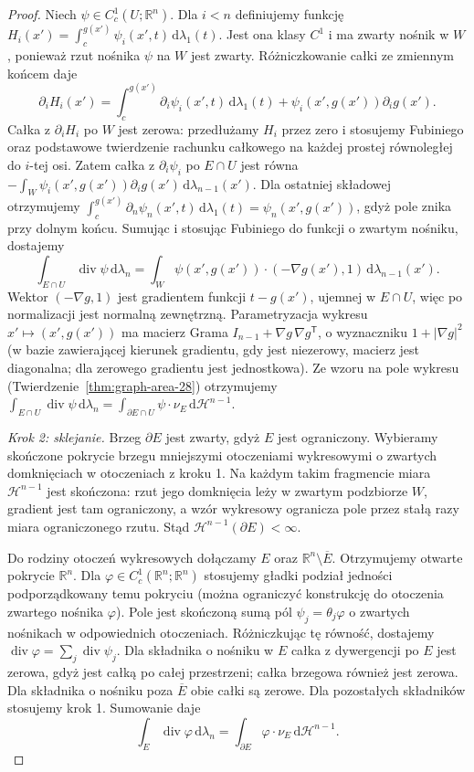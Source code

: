 \begin{proof}
Niech $\psi\in C_c^1(U;\mathbb R^n)$.
Dla $i<n$ definiujemy funkcję
$H_i(x')=\int_c^{g(x')}\psi_i(x',t)\,\mathrm d\lambda_1(t)$.
Jest ona klasy $C^1$ i ma zwarty nośnik w $W$,
ponieważ rzut nośnika $\psi$ na $W$ jest zwarty.
Różniczkowanie całki ze zmiennym końcem daje
\[
 \partial_i H_i(x')=
 \int_c^{g(x')}\partial_i\psi_i(x',t)\,\mathrm d\lambda_1(t)
 +\psi_i(x',g(x'))\partial_i g(x').
\]
Całka z $\partial_i H_i$ po $W$ jest zerowa:
przedłużamy $H_i$ przez zero i stosujemy Fubiniego
oraz podstawowe twierdzenie rachunku całkowego
na każdej prostej równoległej do $i$-tej osi.
Zatem całka z $\partial_i\psi_i$ po $E\cap U$
jest równa
$-\int_W\psi_i(x',g(x'))\partial_i g(x')
\,\mathrm d\lambda_{n-1}(x')$.
Dla ostatniej składowej otrzymujemy
$\int_c^{g(x')}\partial_n\psi_n(x',t)\,\mathrm d\lambda_1(t)
=\psi_n(x',g(x'))$, gdyż pole znika przy dolnym końcu.
Sumując i stosując Fubiniego do funkcji o zwartym
nośniku, dostajemy
\[
 \int_{E\cap U}\operatorname{div}\psi\,\mathrm d\lambda_n
 =\int_W\psi(x',g(x'))\cdot(-\nabla g(x'),1)
 \,\mathrm d\lambda_{n-1}(x').
\]
Wektor $(-\nabla g,1)$ jest gradientem funkcji
$t-g(x')$, ujemnej w $E\cap U$, więc po normalizacji
jest normalną zewnętrzną. Parametryzacja wykresu
$x'\mapsto(x',g(x'))$ ma macierz Grama
$I_{n-1}+\nabla g\,\nabla g^{\mathsf T}$,
o wyznaczniku $1+|\nabla g|^2$ (w bazie zawierającej
kierunek gradientu, gdy jest niezerowy, macierz jest
diagonalna; dla zerowego gradientu jest jednostkowa).
Ze wzoru na pole wykresu
(Twierdzenie~\ref{thm:graph-area-28}) otrzymujemy
$\int_{E\cap U}\operatorname{div}\psi\,\mathrm d\lambda_n
=\int_{\partial E\cap U}\psi\cdot\nu_E
\,\mathrm d\mathcal H^{n-1}$.

\emph{Krok 2: sklejanie.}
Brzeg $\partial E$ jest zwarty, gdyż $E$ jest ograniczony.
Wybieramy skończone pokrycie brzegu mniejszymi
otoczeniami wykresowymi o zwartych domknięciach
w otoczeniach z kroku 1. Na każdym takim fragmencie
miara $\mathcal H^{n-1}$ jest skończona:
rzut jego domknięcia leży w zwartym podzbiorze $W$,
gradient jest tam ograniczony, a wzór wykresowy
ogranicza pole przez stałą razy miara ograniczonego rzutu.
Stąd $\mathcal H^{n-1}(\partial E)<\infty$.

Do rodziny otoczeń wykresowych dołączamy $E$
oraz $\mathbb R^n\setminus\overline E$.
Otrzymujemy otwarte pokrycie $\mathbb R^n$.
Dla $\varphi\in C_c^1(\mathbb R^n;\mathbb R^n)$
stosujemy gładki podział jedności podporządkowany
temu pokryciu (można ograniczyć konstrukcję do
otoczenia zwartego nośnika $\varphi$).
Pole jest skończoną sumą pól $\psi_j=\theta_j\varphi$
o zwartych nośnikach w odpowiednich otoczeniach.
Różniczkując tę równość, dostajemy
$\operatorname{div}\varphi=\sum_j\operatorname{div}\psi_j$.
Dla składnika o nośniku w $E$ całka z dywergencji
po $E$ jest zerowa, gdyż jest całką po całej przestrzeni;
całka brzegowa również jest zerowa.
Dla składnika o nośniku poza $\overline E$
obie całki są zerowe. Dla pozostałych składników
stosujemy krok 1. Sumowanie daje
\[
 \int_E\operatorname{div}\varphi\,\mathrm d\lambda_n
 =\int_{\partial E}\varphi\cdot\nu_E\,\mathrm d\mathcal H^{n-1}.
\]


\end{proof}
